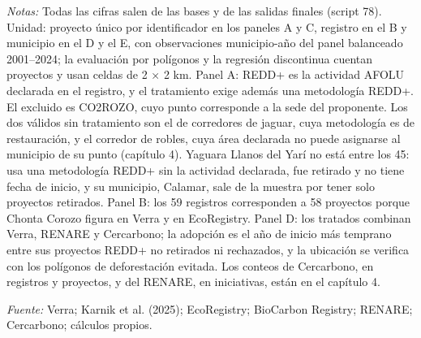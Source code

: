 \begin{table}[htbp]
\begin{threeparttable}
\begin{tablenotes}[flushleft]
\item \textit{Notas:} Todas las cifras salen de las bases y de las salidas finales (script 78). Unidad: proyecto único por identificador en los paneles A y C, registro en el B y municipio en el D y el E, con observaciones municipio-año del panel balanceado 2001--2024; la evaluación por polígonos y la regresión discontinua cuentan proyectos y usan celdas de 2 × 2 km. Panel A: REDD+ es la actividad AFOLU declarada en el registro, y el tratamiento exige además una metodología REDD+. El excluido es CO2ROZO, cuyo punto corresponde a la sede del proponente. Los dos válidos sin tratamiento son el de corredores de jaguar, cuya metodología es de restauración, y el corredor de robles, cuya área declarada no puede asignarse al municipio de su punto (capítulo 4). Yaguara Llanos del Yarí no está entre los 45: usa una metodología REDD+ sin la actividad declarada, fue retirado y no tiene fecha de inicio, y su municipio, Calamar, sale de la muestra por tener solo proyectos retirados. Panel B: los 59 registros corresponden a 58 proyectos porque Chonta Corozo figura en Verra y en EcoRegistry. Panel D: los tratados combinan Verra, RENARE y Cercarbono; la adopción es el año de inicio más temprano entre sus proyectos REDD+ no retirados ni rechazados, y la ubicación se verifica con los polígonos de deforestación evitada. Los conteos de Cercarbono, en registros y proyectos, y del RENARE, en iniciativas, están en el capítulo 4.
\item \textit{Fuente:} Verra; Karnik et al. (2025); EcoRegistry; BioCarbon Registry; RENARE; Cercarbono; cálculos propios.
\end{tablenotes}
\end{threeparttable}
\end{table}

